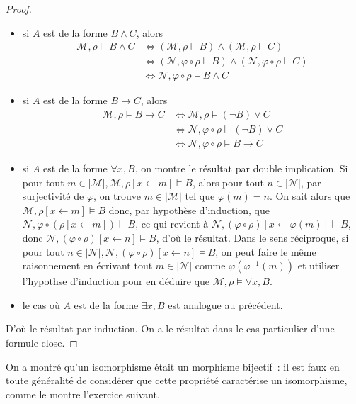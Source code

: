 \begin{proof}
\begin{itemize}
  \item si $A$ est de la forme $B\land C$, alors
    \begin{align*}
      \mathcal M, \rho \models B\land C &\iff (\mathcal M,\rho\models B)\land
      (\mathcal M,\rho\models C) \\
      &\iff (\mathcal N,\varphi\circ\rho\models B)\land
      (\mathcal N,\varphi\circ\rho\models C)\\
      &\iff \mathcal N,\varphi\circ \rho \models B\land C
      \end{align*}
  \item si $A$ est de la forme $B\to C$, alors
    \begin{align*}
      \mathcal M,\rho\models B\to C &\iff
      \mathcal M,\rho\models (\lnot B)\lor C\\
      &\iff \mathcal N,\varphi\circ\rho\models (\lnot B) \lor C\\
      &\iff \mathcal N,\varphi\circ\rho\models B \to C
    \end{align*}
  \item si $A$ est de la forme $\forall x,B$, on montre le résultat par double
    implication. Si pour tout
    $m \in |\mathcal M|, \mathcal M,\rho[x\leftarrow m]\models B$, alors
    pour tout $n \in |\mathcal N|$, par surjectivité de $\varphi$, on trouve
    $m \in |\mathcal M|$ tel que $\varphi(m) = n$. On sait alors que
    $\mathcal M,\rho[x\leftarrow m]\models B$ donc, par hypothèse d'induction,
    que $\mathcal N,\varphi\circ(\rho[x\leftarrow m])\models B$, ce qui revient
    à $\mathcal N,(\varphi\circ\rho)[x\leftarrow \varphi(m)]\models B$, donc
    $\mathcal N,(\varphi\circ\rho)[x\leftarrow n]\models B$, d'où le résultat.
    Dans le sens réciproque, si pour tout
    $n\in|\mathcal N|, \mathcal N,(\varphi\circ\rho)[x\leftarrow n]\models B$,
    on peut faire le même raisonnement en écrivant tout $m \in |\mathcal N|$
    comme $\varphi(\varphi^{-1}(m))$ et utiliser l'hypothse d'induction pour en
    déduire que $\mathcal M,\rho\models \forall x,B$.
  \item le cas où $A$ est de la forme $\exists x, B$ est analogue au précédent.
  \end{itemize}
  D'où le résultat par induction. On a le résultat dans le cas particulier d'une
  formule close.
\end{proof}

On a montré qu'un isomorphisme était un morphisme bijectif~: il est faux en
toute généralité de considérer que cette propriété caractérise un isomorphisme,
comme le montre l'exercice suivant.

